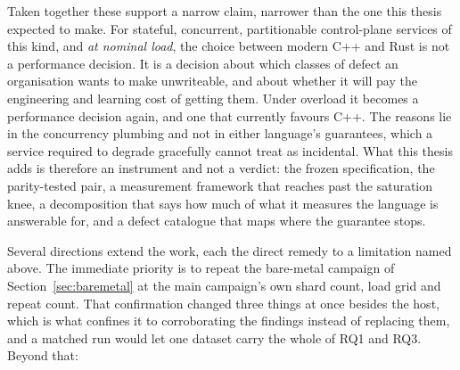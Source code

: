 \documentclass[english,oneside,a4paper,censored,csm,software-track-2020]{HYthesisML}
\begin{document}
Taken together these support a narrow claim, narrower than the one this thesis expected
to make. For stateful, concurrent, partitionable control-plane services of this kind, and
\emph{at nominal load}, the choice between modern C++ and Rust is not a performance decision. It
is a decision about which classes of defect an organisation wants to make unwriteable, and about
whether it will pay the engineering and learning cost of getting them. Under overload it becomes
a performance decision again, and one that currently favours C++. The reasons lie in the
concurrency plumbing and not in either language's guarantees, which a service required to degrade
gracefully cannot treat as incidental. What this thesis adds is therefore an instrument and
not a verdict: the frozen specification, the parity-tested pair, a measurement framework that
reaches past the saturation knee, a decomposition that says how much of what it measures the
language is answerable for, and a defect catalogue that maps where the guarantee stops.

Several directions extend the work, each the direct remedy to a limitation named above. The
immediate priority is to repeat the bare-metal campaign of Section~\ref{sec:baremetal} at the
main campaign's own shard count, load grid and repeat count. That confirmation changed three
things at once besides the host, which is what confines it to corroborating the findings instead
of replacing them, and a matched run would let one dataset carry the whole of RQ1 and RQ3. Beyond
that:
\end{document}
